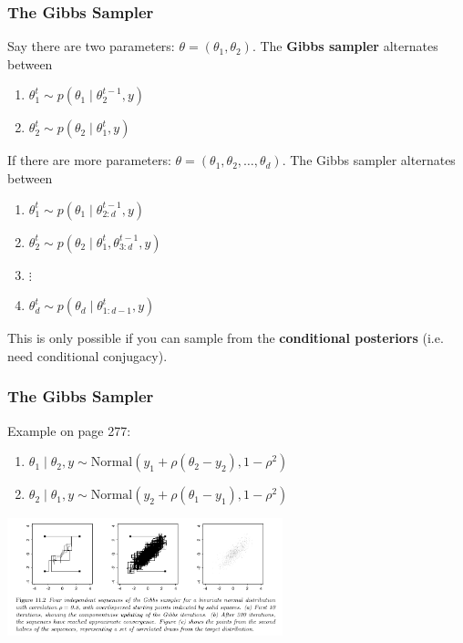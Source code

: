\documentclass{beamer}
\begin{document}
\begin{frame}
\frametitle{The Gibbs Sampler}

Say there are two parameters: $\theta = (\theta_1, \theta_2)$. The {\bf Gibbs sampler} alternates between 
\begin{enumerate}
\item $\theta_1^t \sim p(\theta_1 \mid \theta_2^{t-1}, y)$
\item $\theta_2^t \sim p(\theta_2 \mid \theta_1^{t}, y)$
\end{enumerate}

If there are more parameters: $\theta = (\theta_1, \theta_2, \ldots, \theta_d)$. The Gibbs sampler alternates between 
\begin{enumerate}
\item $\theta_1^t \sim p(\theta_1 \mid \theta_{2:d}^{t-1}, y)$
\item $\theta_2^t \sim p(\theta_2 \mid \theta_1^t, \theta_{3:d}^{t-1}, y)$
\item $\vdots$
\item $\theta_d^t \sim p(\theta_d \mid \theta_{1:d-1}^{t}, y)$
\end{enumerate}

This is only possible if you can sample from the {\bf conditional posteriors} (i.e. need conditional conjugacy).

\end{frame}

\begin{frame}
\frametitle{The Gibbs Sampler}

Example on page 277:
\begin{enumerate}
\item $\theta_1 \mid \theta_2, y \sim \text{Normal}(y_1 + \rho(\theta_2 - y_2), 1-\rho^2)$
\item $\theta_2 \mid \theta_1, y \sim \text{Normal}(y_2 + \rho(\theta_1 - y_1), 1-\rho^2)$
\end{enumerate}

\begin{center}
\includegraphics[width=80mm]{gibbs.png}
\end{center}


\end{frame}
\end{document}
